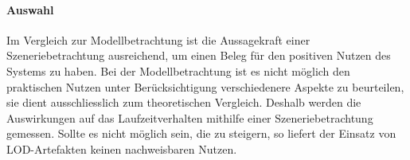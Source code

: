 \paragraph{Auswahl}
Im Vergleich zur Modellbetrachtung ist die Aussagekraft einer Szeneriebetrachtung ausreichend, um einen Beleg für den positiven Nutzen des Systems zu haben. Bei der Modellbetrachtung ist es nicht möglich den praktischen Nutzen unter Berücksichtigung verschiedenere Aspekte zu beurteilen, sie dient ausschliesslich zum theoretischen Vergleich. Deshalb werden die Auswirkungen auf das Laufzeitverhalten mithilfe einer Szeneriebetrachtung gemessen. Sollte es nicht möglich sein, die  zu steigern, so liefert der Einsatz von LOD-Artefakten keinen nachweisbaren Nutzen.
